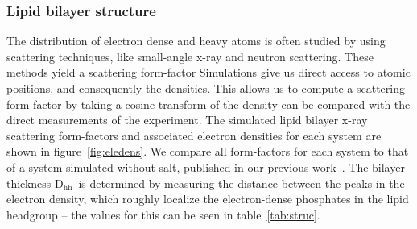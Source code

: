 \documentclass[journal=langd5,manuscript=article]{achemso}
\newcommand{\dhh}{$\text{D}_\text{hh}$}
\begin{document}
\subsubsection{Lipid bilayer structure}
The distribution of electron dense and heavy atoms is often studied by using
scattering techniques, like small-angle x-ray and neutron scattering. These methods
yield a scattering form-factor
 Simulations give 
us direct access to atomic positions, and consequently
the densities. This allows us to compute a 
scattering form-factor by taking a cosine transform of the density
can be compared with the direct measurements of the experiment.
The simulated lipid bilayer x-ray scattering form-factors and associated 
electron densities for each system are shown in figure~\ref{fig:eledens}.
We compare all form-factors for each system to that of a system simulated without salt, published
in our previous work~\cite{kruczek:2017}.
The bilayer thickness \dhh~is determined by measuring the distance between the
peaks in the electron density, which roughly localize the electron-dense phosphates in the
lipid headgroup -- the values for this can be seen in table~\ref{tab:struc}.
\end{document}
